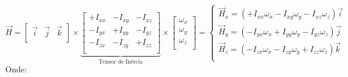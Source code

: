 \documentclass{article}
\begin{document}
                \begin{equation}
                    \boxed{
                        \vec{H} = 
                        \begin{bmatrix}
                            \vec{i} & \vec{j} & \vec{k}\\
                        \end{bmatrix} \times 
                        \underbrace{
                            \begin{bmatrix}
                                +I_{xx} & -I_{xy} & -I_{xz}\\
                                -I_{yx} & +I_{yy} & -I_{yz}\\
                                -I_{zx} & -I_{zy} & +I_{zz}\\
                            \end{bmatrix}
                        }_{\text{Tensor de Inércia}} \times
                        \begin{bmatrix}
                            \omega_{x}\\
                            \omega_{y}\\
                            \omega_{z}\\
                        \end{bmatrix} = 
                        \begin{cases}
                            \vec{H}_{x} = (+I_{xx}\omega_{x} - I_{xy}\omega_{y} - I_{xz}\omega_{z})\vec{i}\\
                            \vec{H}_{y} = (-I_{yx}\omega_{x} + I_{yy}\omega_{y} - I_{yz}\omega_{z})\vec{j}\\
                            \vec{H}_{z} = (-I_{zx}\omega_{x} - I_{zy}\omega_{y} + I_{zz}\omega_{z})\vec{k}\\
                        \end{cases}
                    }
                \end{equation}
            Onde:
\end{document}
